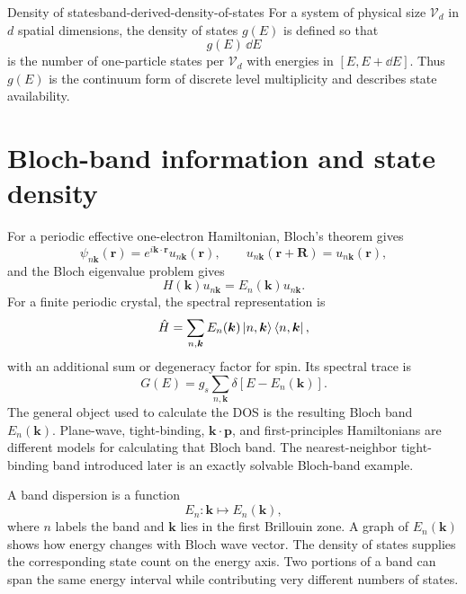 \begin{definition}{Density of states}{band-derived-density-of-states}
For a system of physical size $\mathcal V_d$ in $d$ spatial dimensions, the
density of states $g(E)$ is defined so that
\begin{equation}
  g(E)\,\dd E
  \label{eq:dos-operational-definition}
\end{equation}
is the number of one-particle states per $\mathcal V_d$ with energies in
$[E,E+\dd E]$.  Thus $g(E)$ is the continuum form of discrete level
multiplicity and describes state availability.
\end{definition}

\section{Bloch-band information and state density}

For a periodic effective one-electron Hamiltonian, Bloch's theorem gives
\begin{equation}
  \psi_{n\bm k}(\bm r)
  =e^{i\bm k\cdot\bm r}u_{n\bm k}(\bm r),
  \qquad
  u_{n\bm k}(\bm r+\bm R)=u_{n\bm k}(\bm r),
  \label{eq:dos-bloch-state}
\end{equation}
and the Bloch eigenvalue problem gives
\begin{equation}
  H(\bm k)u_{n\bm k}=E_n(\bm k)u_{n\bm k}.
  \label{eq:dos-bloch-eigenvalue-problem}
\end{equation}
For a finite periodic crystal, the spectral representation is
\begin{equation}
  \hat H
  =\sum_{n,\bm k}E_n(\bm k)
   \ket{n,\bm k}\bra{n,\bm k},
  \label{eq:bloch-hamiltonian-spectral-representation}
\end{equation}
with an additional sum or degeneracy factor for spin.  Its spectral trace is
\begin{equation}
  G(E)
  =g_s\sum_{n,\bm k}
   \delta[E-E_n(\bm k)].
  \label{eq:finite-bloch-spectral-density}
\end{equation}
The general object used to calculate the DOS is the resulting Bloch band
$E_n(\bm k)$.  Plane-wave, tight-binding, $\bm k\cdot\bm p$, and first-principles
Hamiltonians are different models for calculating that Bloch band.  The
nearest-neighbor tight-binding band introduced later is an exactly solvable
Bloch-band example.

A band dispersion is a function
\begin{equation}
  E_n:\bm k\longmapsto E_n(\bm k),
  \label{eq:band-as-energy-map}
\end{equation}
where $n$ labels the band and $\bm k$ lies in the first Brillouin zone.  A graph
of $E_n(\bm k)$ shows how energy changes with Bloch wave vector.  The density of
states supplies the corresponding state count on the energy axis.  Two portions
of a band can span the same energy interval while contributing very different
numbers of states.

